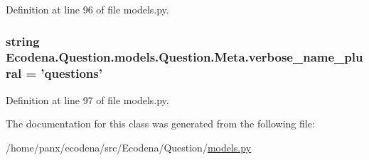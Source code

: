 Definition at line 96 of file models.py.

\hypertarget{class_ecodena_1_1_question_1_1models_1_1_question_1_1_meta_aa9d8ba6465bbcd410a41f58cb33daaa8}{
\subsubsection[{verbose\_\-name\_\-plural}]{\setlength{\rightskip}{0pt plus 5cm}string {\bf Ecodena.Question.models.Question.Meta.verbose\_\-name\_\-plural} = 'questions'}}
\label{d6/da7/class_ecodena_1_1_question_1_1models_1_1_question_1_1_meta_aa9d8ba6465bbcd410a41f58cb33daaa8}


Definition at line 97 of file models.py.



The documentation for this class was generated from the following file:\begin{DoxyCompactItemize}
\item 
/home/panx/ecodena/src/Ecodena/Question/\hyperlink{_question_2models_8py}{models.py}\end{DoxyCompactItemize}
